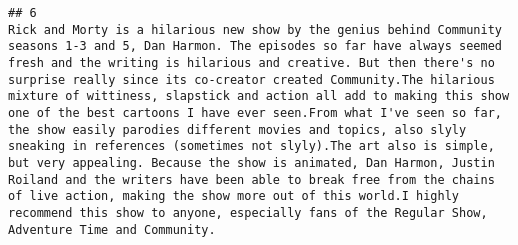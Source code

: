 \documentclass[
]{article}
\begin{document}
\begin{verbatim}
## 6                                                                                                                                                                                                                                                                                                                                                                                                                                                                                                                                                                                                                                                                                                                                                                                                                                                                                                                                                                                                                                                                                                                                                                                                                                                                                                                                                                                                                                                                                                                                                                 Rick and Morty is a hilarious new show by the genius behind Community seasons 1-3 and 5, Dan Harmon. The episodes so far have always seemed fresh and the writing is hilarious and creative. But then there's no surprise really since its co-creator created Community.The hilarious mixture of wittiness, slapstick and action all add to making this show one of the best cartoons I have ever seen.From what I've seen so far, the show easily parodies different movies and topics, also slyly sneaking in references (sometimes not slyly).The art also is simple, but very appealing. Because the show is animated, Dan Harmon, Justin Roiland and the writers have been able to break free from the chains of live action, making the show more out of this world.I highly recommend this show to anyone, especially fans of the Regular Show, Adventure Time and Community.

\end{verbatim}
\end{document}
